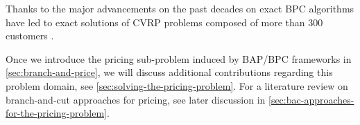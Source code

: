 Thanks to the major advancements on the past decades
on exact BPC algorithms
have led to exact solutions of CVRP problems composed of
more than $300$ customers \parencite{costa2019}.


Once we introduce the pricing sub-problem induced by BAP/BPC frameworks
in \cref{sec:branch-and-price},
we will discuss additional contributions regarding this problem domain,
see \cref{sec:solving-the-pricing-problem}.
For a literature review on branch-and-cut approaches for pricing, see later discussion
in \cref{sec:bac-approaches-for-the-pricing-problem}.

\begin{comment}
\cite{jepsen2011}

Before 1980 very few exact algorithms for cvrp and vrptw had been
proposed, but in the early 1980s two new exact methods where proposed.
From this point the history of exact methods for cvrp and vrptw can
be divided into three phases. The first phase was the introduction of the
Set Partition and the development of Branch-and-Cut-and-Price (bp) algo-
rithms using a relaxed pricing problem. The second was the development of
Branch-and-Cut (bac) algorithms. In the current phase the pricing problem
is no longer relaxed and cuts in the master problem of the Branch-and-Cut-
and-Price algorithms is used. The first two phases where started at the same
point in time and there is still development on the algorithms in the context
of cvrp and vrptw. The algorithms from these two phases are also used
on several other variants of the Vehicle Routing Problem. The third phase
was started in the middle of the 2000s and the algorithms from this phase
are currently the best overall performing algorithms.
\end{comment}
